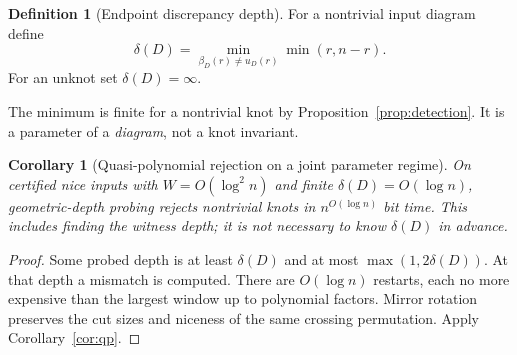 \documentclass[11pt]{article}
\newtheorem{corollary}[theorem]{Corollary}
\theoremstyle{definition}\newtheorem{definition}[theorem]{Definition}
\theoremstyle{remark}\newtheorem{remark}[theorem]{Remark}
\begin{document}
\begin{definition}[Endpoint discrepancy depth]
For a nontrivial input diagram define
\begin{equation}
 \delta(D)=\min_{\beta_D(r)\ne u_D(r)}\min(r,n-r).
 \label{eq:delta}
\end{equation}
For an unknot set $\delta(D)=\infty$.
\end{definition}
The minimum is finite for a nontrivial knot by Proposition~\ref{prop:detection}. It is a parameter of a \emph{diagram}, not a knot invariant.

\begin{corollary}[Quasi-polynomial rejection on a joint parameter regime]\label{cor:reject}
On certified nice inputs with $W=O(\log^2 n)$ and finite $\delta(D)=O(\log n)$, geometric-depth probing rejects nontrivial knots in $n^{O(\log n)}$ bit time. This includes finding the witness depth; it is not necessary to know $\delta(D)$ in advance.
\end{corollary}
\begin{proof}
Some probed depth is at least $\delta(D)$ and at most $\max(1,2\delta(D))$. At that depth a mismatch is computed. There are $O(\log n)$ restarts, each no more expensive than the largest window up to polynomial factors. Mirror rotation preserves the cut sizes and niceness of the same crossing permutation. Apply Corollary~\ref{cor:qp}.
\end{proof}
\end{document}
